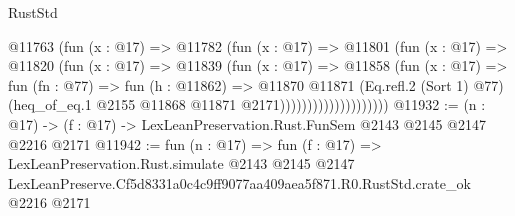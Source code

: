 \begin{lexlean}{RustStd}
\begin{coremodule}
                            @11763
                              (fun (x : @17) =>
                              @11782
                                (fun (x : @17) =>
                                @11801
                                  (fun (x : @17) =>
                                  @11820
                                    (fun (x : @17) =>
                                    @11839
                                      (fun (x : @17) =>
                                      @11858
                                        (fun (x : @17) =>
                                        fun (fn : @77) =>
                                        fun (h : @11862) =>
                                        @11870
                                          @11871
                                          (Eq.refl.{2} (Sort 1) @77)
                                          (heq_of_eq.{1}
                                            @2155
                                            @11868
                                            @11871
                                            @2171))))))))))))))))))))
@11932 := (n : @17) -> (f : @17) -> LexLeanPreservation.Rust.FunSem @2143 @2145 @2147 @2216 @2171
@11942 := fun (n : @17) =>
  fun (f : @17) =>
  LexLeanPreservation.Rust.simulate
    @2143
    @2145
    @2147
    LexLeanPreserve.Cf5d8331a0c4c9ff9077aa409aea5f871.R0.RustStd.crate_ok
    @2216
    @2171
\end{coremodule}
\end{lexlean}

